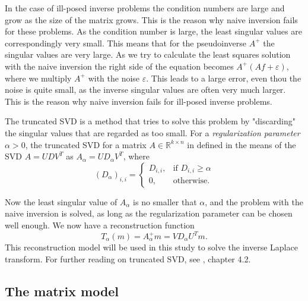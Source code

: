 \documentclass[12pt,a4]{article}
\newcommand{\R}{{\mathbb R}}
\newcommand{\eps}{\varepsilon}
\begin{document}
In the case of ill-posed inverse problems the condition numbers are large and grow as the size of the matrix grows. This is the reason why naive inversion fails for these problems. As the condition number is large, the least singular values are correspondingly very small. This means that for the pseudoinverse $A^+$ the singular values are very large. As we try to calculate the least squares solution with the naive inversion the right side of the equation becomes $A^+ (Af + \eps)$, where we multiply $A^+$ with the noise $\eps$. This leads to a large error, even thou the noise is quite small, as the inverse singular values are often very much larger. This is the reason why naive inversion fails for ill-posed inverse problems.

The truncated SVD is a method that tries to solve this problem by "discarding" the singular values that are regarded as too small. For a \emph{regularization parameter} $\alpha > 0$, the truncated SVD for a matrix $A \in \R^{k \times n}$ in defined in the means of the SVD $A = U D V^T$ as $A_{\alpha} = U D_{\alpha} V^T$, where
\begin{equation}
(D_{\alpha})_{i,i} =
\begin{cases}
D_{i,i}, & \text{if } D_{i,i} \geq \alpha \\
0,       & \text{otherwise}.
\end{cases}
\end{equation}

Now the least singular value of $A_{\alpha}$ is no smaller that $\alpha$, and the problem with the naive inversion is solved, as long as the regularization parameter can be chosen well enough. We now have a reconstruction function
\begin{equation}
T_{\alpha}(m) = A_{\alpha}^+ m = V D_{\alpha} U^T m.
\end{equation}
This reconstruction model will be used in this study to solve the inverse Laplace transform. For further reading on truncated SVD, see \cite{samu}, chapter 4.2.



\subsection{The matrix model}\label{sec:matrixmodel}
\end{document}
